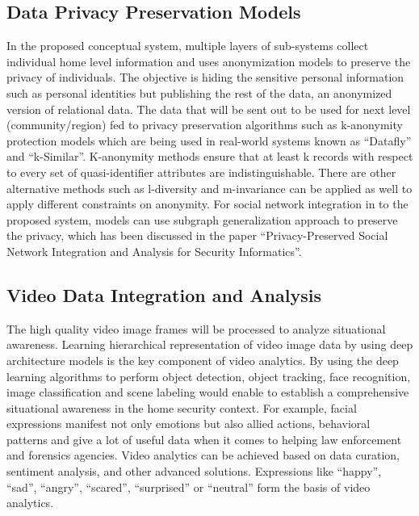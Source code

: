 \documentclass[sigconf]{acmart}
\begin{document}
\subsection{Data Privacy Preservation Models}
In the proposed conceptual system, multiple layers of sub-systems collect individual home level information and uses anonymization models to preserve the privacy of individuals. The objective is hiding the sensitive personal information such as personal identities but publishing the rest of the data, an anonymized version of relational data. The data that will be sent out to be used for next level (community/region) fed to privacy preservation algorithms such as k-anonymity protection models which are being used in real-world systems known as ``Datafly'' and ``k-Similar''. K-anonymity methods ensure that at least k records with respect to every set of quasi-identifier attributes are indistinguishable. There are other alternative methods such as l-diversity and m-invariance can be applied as well to apply different constraints on anonymity. For social network integration in to the proposed system, models can use subgraph generalization approach to preserve the privacy, which has been discussed in the paper ``Privacy-Preserved Social Network Integration and Analysis for Security Informatics''.

\subsection{Video Data Integration and Analysis}
The high quality video image frames will be processed to analyze situational awareness. Learning hierarchical representation of video image data by using deep architecture models is the key component of video analytics. By using the deep learning algorithms to perform object detection, object tracking, face recognition, image classification and scene labeling would enable to establish a comprehensive situational awareness in the home security context. For example, facial expressions manifest not only emotions but also allied actions, behavioral patterns and give a lot of useful data when it comes to helping law enforcement and forensics agencies. Video analytics can be achieved based on data curation, sentiment analysis, and other advanced solutions. Expressions like ``happy'', ``sad'', ``angry'', ``scared'', ``surprised'' or ``neutral'' form the basis of video analytics.
\end{document}
